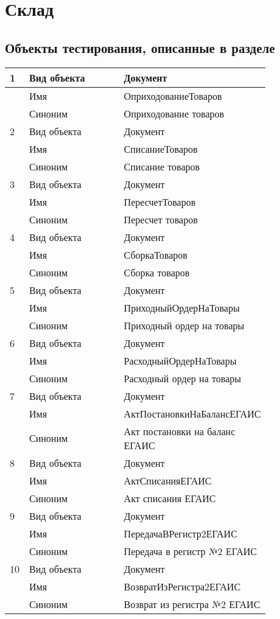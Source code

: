 \section{Склад}
\subsection{Объекты тестирования, описанные в разделе}

\begin{longtable}{p{0.05\linewidth}p{0.4\linewidth}p{0.4\linewidth}}
    	\hline
    1 & Вид объекта & Документ \\
    \hline
    & Имя & ОприходованиеТоваров \\
     \hline
       & Синоним  & Оприходование товаров \\
    \hline
    2 & Вид объекта  & Документ \\
    \hline
    & Имя & СписаниеТоваров \\
    \hline
    & Синоним  & Списание товаров \\
    \hline
    3 & Вид объекта  & Документ \\
    \hline
    & Имя & ПересчетТоваров \\
    \hline
    & Синоним  & Пересчет товаров \\
    \hline
    4 & Вид объекта  & Документ \\
   \hline
   & Имя & СборкаТоваров \\
   \hline
   & Синоним  & Сборка товаров \\
   \hline
   5 & Вид объекта  & Документ \\
   \hline
   & Имя & ПриходныйОрдерНаТовары \\
   \hline
   & Синоним  & Приходный ордер на товары \\
   \hline
    6 & Вид объекта  & Документ \\
   \hline
   & Имя & РасходныйОрдерНаТовары \\
   \hline
   & Синоним  & Расходный ордер на товары \\
   \hline
   7 & Вид объекта  & Документ \\
   \hline
   & Имя & АктПостановкиНаБалансЕГАИС \\
   \hline
   & Синоним  & Акт постановки на баланс ЕГАИС \\
   \hline
    8 & Вид объекта  & Документ \\
   \hline
   & Имя & АктСписанияЕГАИС \\
   \hline
   & Синоним  & Акт списания ЕГАИС \\
   \hline
    9 & Вид объекта  & Документ \\
   \hline
   & Имя & ПередачаВРегистр2ЕГАИС \\
   \hline
   & Синоним  & Передача в регистр №2 ЕГАИС \\
   \hline
    10 & Вид объекта  & Документ \\
   \hline
   & Имя & ВозвратИзРегистра2ЕГАИС \\
   \hline
   & Синоним  & Возврат из регистра №2 ЕГАИС \\
   \hline
    \bottomrule %
\end{longtable}